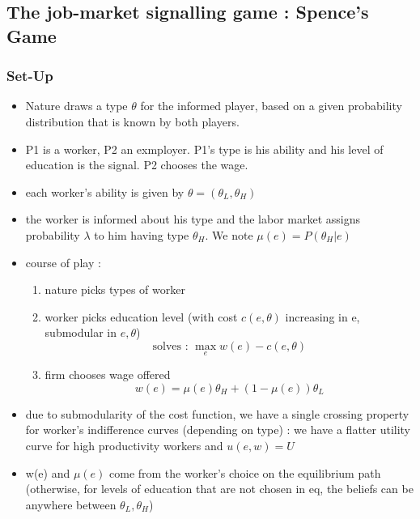 \documentclass{article}
\begin{document}
\subsection{The job-market signalling game : Spence's Game}
\subsubsection{Set-Up}
\begin{itemize}
    \item Nature draws a type $\theta$ for the informed player, based on a given probability distribution that is known by both players. 
    \item P1 is a worker, P2 an exmployer. P1's type is his ability and his level of education is the signal. P2 chooses the wage. 
    \item each worker's ability is given by $\theta=(\theta_L,\theta_H)$ 
    \item the worker is informed about his type and the labor market assigns probability $\lambda$ to him having type $\theta_H$. We note $\mu(e) = P(\theta_H|e)$ 
    \item course of play : 
    \begin{enumerate}
        \item nature picks types of worker
        \item worker picks education level (with cost $c(e,\theta)$ increasing in e, submodular in $e,\theta$)
        \begin{equation}
            \text{solves : } \max_e w(e)-c(e,\theta)
        \end{equation}
        \item firm chooses wage offered
        \begin{equation}
            w(e) = \mu(e)\theta_H + (1-\mu(e))\theta_L
        \end{equation}
    \end{enumerate}
    \item due to submodularity of the cost function, we have a single crossing property for worker's indifference curves (depending on type) : we have a flatter utility curve for high productivity workers and $u(e,w)=U$
    \item w(e) and $\mu(e)$ come from the worker's choice on the equilibrium path (otherwise, for levels of education that are not chosen in eq, the beliefs can be anywhere between $\theta_L, \theta_H$)
\end{itemize}
\end{document}

